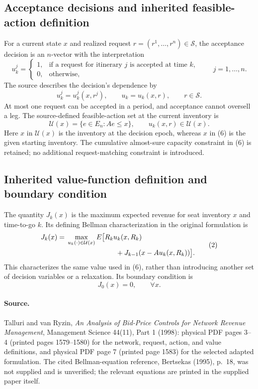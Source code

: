\documentclass{article}
\begin{document}
\subsection*{Acceptance decisions and inherited feasible-action definition}
For a current state $x$ and realized request $r=(r^1,\ldots,r^n)\in\mathcal{S}$, the acceptance decision is an $n$-vector with the interpretation
\[
u_k^j=\begin{cases}
1,&\text{if a request for itinerary }j\text{ is accepted at time }k,\\
0,&\text{otherwise},
\end{cases}
\qquad j=1,\ldots,n.
\]
The source describes the decision's dependence by
\[
u_k^j=u_k^j(x,r^j),\qquad
u_k=u_k(x,r),\qquad r\in\mathcal{S}.
\]
At most one request can be accepted in a period, and acceptance cannot oversell a leg. The source-defined feasible-action set at the current inventory is
\[
\mathcal{U}(x)=\{e\in E_n:Ae\leq x\},
\qquad u_k(x,r)\in\mathcal{U}(x).
\]
Here $x$ in $\mathcal{U}(x)$ is the inventory at the decision epoch, whereas $x$ in (6) is the given starting inventory. The cumulative almost-sure capacity constraint in (6) is retained; no additional request-matching constraint is introduced.

\subsection*{Inherited value-function definition and boundary condition}
The quantity $J_k(x)$ is the maximum expected revenue for seat inventory $x$ and time-to-go $k$. Its defining Bellman characterization in the original formulation is
\begin{equation}
\begin{aligned}
J_k(x)={}&\max_{u_k(\cdot)\in\mathcal{U}(x)}
E\bigl[R_ku_k(x,R_k)\\
&\hspace{25mm}{}+J_{k-1}(x-Au_k(x,R_k))\bigr].
\end{aligned}\tag{2}
\end{equation}
This characterizes the same value used in (6), rather than introducing another set of decision variables or a relaxation. Its boundary condition is
\begin{equation}
J_0(x)=0,\qquad\forall x.\tag{3}
\end{equation}

\paragraph{Source.}
Talluri and van Ryzin, \emph{An Analysis of Bid-Price Controls for Network Revenue Management}, Management Science 44(11), Part 1 (1998): physical PDF pages 3--4 (printed pages 1579--1580) for the network, request, action, and value definitions, and physical PDF page 7 (printed page 1583) for the selected adapted formulation. The cited Bellman-equation reference, Bertsekas (1995), p.~18, was not supplied and is unverified; the relevant equations are printed in the supplied paper itself.
\end{document}
